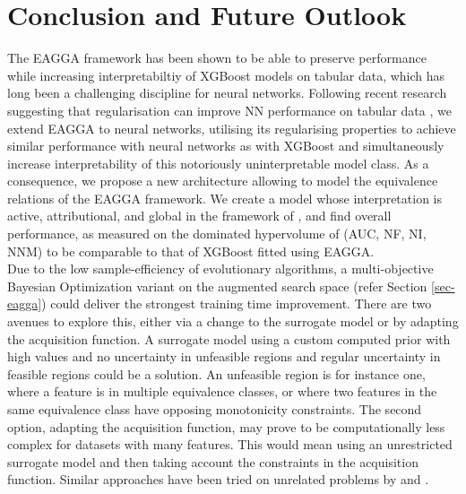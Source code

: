 \documentclass[twoside,11pt]{article}
\begin{document}
\section{Conclusion and Future Outlook}
The EAGGA framework has been shown to be able to preserve performance while increasing interpretabiltiy of XGBoost models on tabular data, which has long been 
a challenging discipline for neural networks. Following recent research suggesting that regularisation can improve NN performance on
tabular data \citep[8]{NEURIPS2021_c902b497}, we extend EAGGA \citep{EAGGA} to neural networks, utilising its regularising properties to achieve similar
performance with neural networks as with XGBoost and simultaneously increase interpretability of this notoriously uninterpretable model class.
As a consequence, we propose a new architecture allowing to model the equivalence relations of the EAGGA framework.
We create a model whose interpretation is active, attributional, and global in the framework of \citet[pp. 3f]{survey_NN_interpretability}, and find
overall performance, as measured on the dominated hypervolume of (AUC, NF, NI, NNM) to be comparable to that of XGBoost fitted using EAGGA.
\\

Due to the low sample-efficiency of evolutionary algorithms, a multi-objective Bayesian Optimization variant on the augmented search space
(refer Section \ref{sec-eagga}) could deliver the strongest training time improvement.
There are two avenues to explore this, either via a change to the surrogate model or by adapting the acquisition function.
A surrogate model using a custom computed prior with high values and no uncertainty in unfeasible regions and regular uncertainty in feasible regions could be a solution.
An unfeasible region is for instance one, where a feature is in multiple equivalence classes, or where two features in the same equivalence class have opposing
monotonicity constraints.
The second option, adapting the acquisition function, may prove to be computationally less complex for datasets with many features.
This would mean using an unrestricted surrogate model and then taking account the constraints in the acquisition function. Similar approaches have been
tried on unrelated problems by \citep{10.5555/3020751.3020778} and \citep{perrone2019constrainedbayesianoptimizationmaxvalue}.


\end{document}
